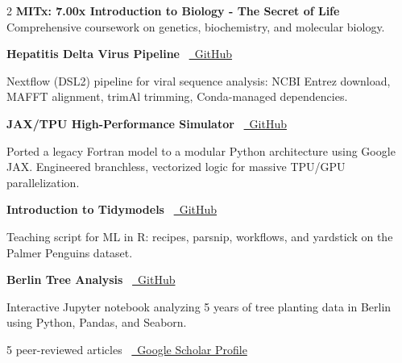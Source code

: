 \documentclass{thejus_cv}
\begin{document}
\begin{paracol}{2}
\textbf{MITx: 7.00x Introduction to Biology - The Secret of Life}\\
{\small Comprehensive coursework on genetics, biochemistry, and molecular biology.}\\[0.4cm]


\textbf{Hepatitis Delta Virus Pipeline} \textbullet\ \href{https://github.com/thejusmahajan/hepatitis-delta-pipeline}{\faGithub\ GitHub}\par
{\small Nextflow (DSL2) pipeline for viral sequence analysis: NCBI Entrez download, MAFFT alignment, trimAl trimming, Conda-managed dependencies.}\par
\vspace{0.3em}

\textbf{JAX/TPU High-Performance Simulator} \textbullet\ \href{https://github.com/thejusmahajan/Agent_Based_Phytoplankton_Model-IBM-Phytoplankton}{\faGithub\ GitHub}\par
{\small Ported a legacy Fortran model to a modular Python architecture using Google JAX. Engineered branchless, vectorized logic for massive TPU/GPU parallelization.}\par
\vspace{0.3em}

\textbf{Introduction to Tidymodels} \textbullet\ \href{https://github.com/thejusmahajan/Introduction_to_Tidymodels}{\faGithub\ GitHub}\par
{\small Teaching script for ML in R: recipes, parsnip, workflows, and yardstick on the Palmer Penguins dataset.}\par
\vspace{0.3em}

\textbf{Berlin Tree Analysis} \textbullet\ \href{https://github.com/thejusmahajan/berlin-tree-analysis}{\faGithub\ GitHub}\par
{\small Interactive Jupyter notebook analyzing 5 years of tree planting data in Berlin using Python, Pandas, and Seaborn.}\par
\vspace{0.4em}


5 peer-reviewed articles \textbullet\ \href{https://scholar.google.com/citations?user=PJkZwAwAAAAJ}{\faGraduationCap\ Google Scholar Profile}




\end{paracol}
\end{document}
